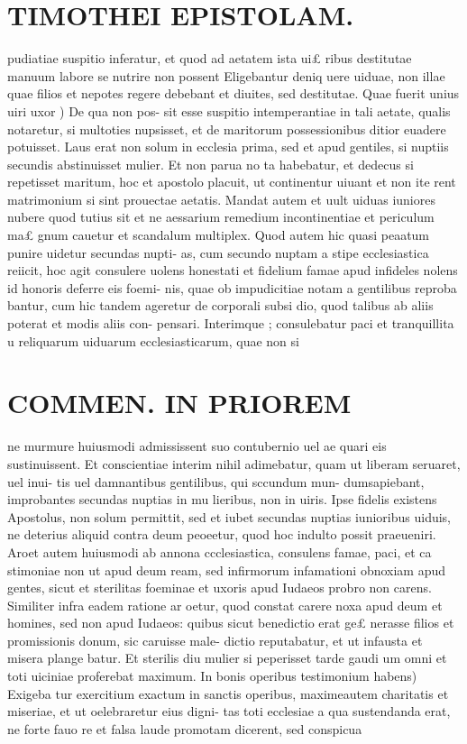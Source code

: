 \documentclass{article}
\begin{document}
\begin{pages}
\section*{TIMOTHEI EPISTOLAM. }
\marginpar{[ p.125 ]}\pstart pudiatiae suspitio inferatur, et quod ad aetatem ista ui£ ribus destitutae manuum labore se nutrire non possent Eligebantur deniq uere uiduae, non illae quae filios et nepotes regere debebant et diuites, sed destitutae.  \pend\pstart Quae fuerit unius uiri uxor ) De qua non pos- sit esse suspitio intemperantiae in tali aetate, qualis notaretur, si multoties nupsisset, et de maritorum possessionibus ditior euadere potuisset. Laus erat non solum in ecclesia prima, sed et apud gentiles, si nuptiis secundis abstinuisset mulier. Et non parua no ta habebatur, et dedecus si repetisset maritum, hoc et apostolo placuit, ut continentur uiuant et non ite rent matrimonium si sint prouectae aetatis. Mandat autem et uult uiduas iuniores nubere quod tutius sit et ne aessarium remedium incontinentiae et periculum ma£ gnum cauetur et scandalum multiplex. Quod autem hic quasi peaatum punire uidetur secundas nupti- as, cum secundo nuptam a stipe ecclesiastica reiicit, hoc agit consulere uolens honestati et fidelium famae apud infideles nolens id honoris deferre eis foemi- nis, quae ob impudicitiae notam a gentilibus reproba bantur, cum hic tandem ageretur de corporali subsi dio, quod talibus ab aliis poterat et modis aliis con- pensari. Interimque ; consulebatur paci et tranquillita u reliquarum uiduarum ecclesiasticarum, quae non si  \pend
\section*{COMMEN. IN PRIOREM }
\marginpar{[ p.126 ]}\pstart ne murmure huiusmodi admississent suo contubernio uel ae quari eis sustinuissent. Et conscientiae interim nihil adimebatur, quam ut liberam seruaret, uel inui- tis uel damnantibus gentilibus, qui sccundum mun- dumsapiebant, improbantes secundas nuptias in mu lieribus, non in uiris. Ipse fidelis existens Apostolus, non solum permittit, sed et iubet secundas nuptias iunioribus uiduis, ne deterius aliquid contra deum peoeetur, quod hoc indulto possit praeueniri. Aroet autem huiusmodi ab annona ccclesiastica, consulens famae, paci, et ca stimoniae non ut apud deum ream, sed infirmorum infamationi obnoxiam apud gentes, sicut et sterilitas foeminae et uxoris apud Iudaeos probro non carens. Similiter infra eadem ratione ar oetur, quod constat carere noxa apud deum et homines, sed non apud Iudaeos: quibus sicut benedictio erat ge£ nerasse filios et promissionis donum, sic caruisse male- dictio reputabatur, et ut infausta et misera plange batur. Et sterilis diu mulier si peperisset tarde gaudi um omni et toti uiciniae proferebat maximum.  \pend\pstart In bonis operibus testimonium habens) Exigeba tur exercitium exactum in sanctis operibus, maximeautem charitatis et miseriae, et ut oelebraretur eius digni- tas toti ecclesiae a qua sustendanda erat, ne forte fauo re et falsa laude promotam dicerent, sed conspicua  \pend

\end{pages}
\end{document}
